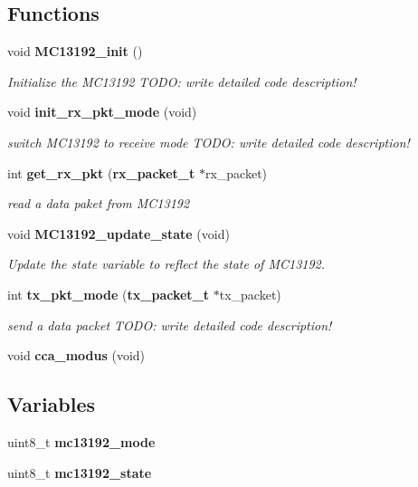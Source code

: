 \subsection*{Functions}
\begin{CompactItemize}
\item 
void {\bf MC13192\_\-init} ()
\begin{CompactList}\small\item\em Initialize the MC13192 TODO: write detailed code description! \item\end{CompactList}\item 
void {\bf init\_\-rx\_\-pkt\_\-mode} (void)
\begin{CompactList}\small\item\em switch MC13192 to receive mode TODO: write detailed code description! \item\end{CompactList}\item 
int {\bf get\_\-rx\_\-pkt} ({\bf rx\_\-packet\_\-t} $\ast$rx\_\-packet)
\begin{CompactList}\small\item\em read a data paket from MC13192 \item\end{CompactList}\item 
void {\bf MC13192\_\-update\_\-state} (void)
\begin{CompactList}\small\item\em Update the state variable to reflect the state of MC13192. \item\end{CompactList}\item 
int {\bf tx\_\-pkt\_\-mode} ({\bf tx\_\-packet\_\-t} $\ast$tx\_\-packet)
\begin{CompactList}\small\item\em send a data packet TODO: write detailed code description! \item\end{CompactList}\item 
void {\bf cca\_\-modus} (void)
\end{CompactItemize}
\subsection*{Variables}
\begin{CompactItemize}
\item 
uint8\_\-t {\bf mc13192\_\-mode}
\item 
uint8\_\-t {\bf mc13192\_\-state}
\end{CompactItemize}


